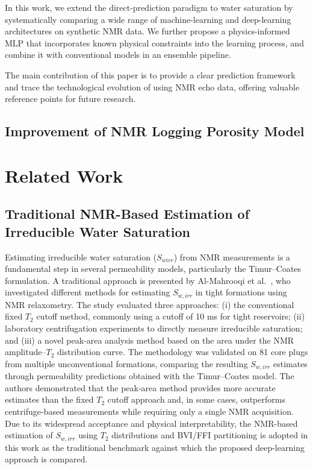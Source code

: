 \documentclass[runningheads]{llncs}
\begin{document}
In this work, we extend the direct-prediction paradigm to water saturation by systematically
comparing a wide range of machine-learning and deep-learning architectures on synthetic NMR data.
We further propose a physics-informed MLP that incorporates known physical constraints into the
learning process, and combine it with conventional models in an ensemble pipeline.

The main contribution of this paper is to provide a clear prediction framework and trace the technological evolution of using NMR echo data, offering valuable reference points for 
future research.

\subsection{Improvement of NMR Logging Porosity Model}



\section{Related Work}
\label{sec:related}

\subsection{Traditional NMR-Based Estimation of Irreducible Water Saturation}

Estimating irreducible water saturation ($S_{wirr}$) from NMR measurements is a fundamental step in several permeability models, particularly the Timur--Coates formulation. A traditional approach is presented by Al-Mahrooqi et al.~\cite{ref_almahrooqi}, who investigated different methods for estimating $S_{w,irr}$ in tight formations using NMR relaxometry. The study evaluated three approaches: (i) the conventional fixed $T_2$ cutoff method, commonly using a cutoff of 10 ms for tight reservoirs; (ii) laboratory centrifugation experiments to directly measure irreducible saturation; and (iii) a novel peak-area analysis method based on the area under the NMR amplitude--$T_2$ distribution curve. The methodology was validated on 81 core plugs from multiple unconventional formations, comparing the resulting $S_{w,irr}$ estimates through permeability predictions obtained with the Timur--Coates model. The authors demonstrated that the peak-area method provides more accurate estimates than the fixed $T_2$ cutoff approach and, in some cases, outperforms centrifuge-based measurements while requiring only a single NMR acquisition. Due to its widespread acceptance and physical interpretability, the NMR-based estimation of $S_{w,irr}$ using $T_2$ distributions and BVI/FFI partitioning is adopted in this work as the traditional benchmark against which the proposed deep-learning approach is compared.
\end{document}
